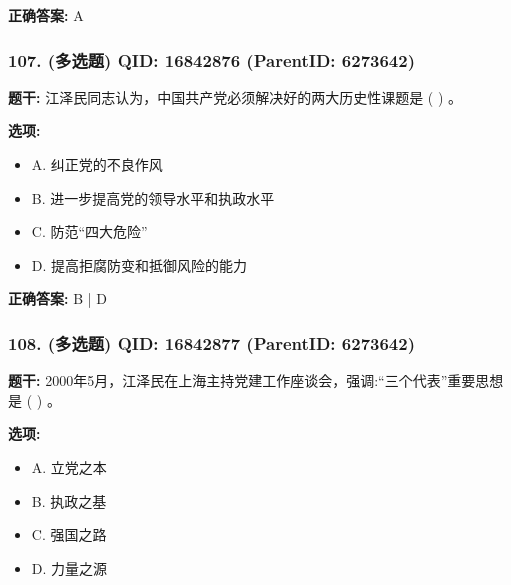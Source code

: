 \documentclass[12pt,UTF8]{ctexart}
\begin{document}
\textbf{正确答案:}
A

\vspace{0.3em}\hrulefill\vspace{0.7em}

\subsubsection*{107. (多选题) \small QID: 16842876 (ParentID: 6273642)}

\textbf{题干:}
江泽民同志认为，中国共产党必须解决好的两大历史性课题是 ( ) 。



\textbf{选项:}
\begin{itemize}[leftmargin=*]

  \item A. 纠正党的不良作风

  \item B. 进一步提高党的领导水平和执政水平

  \item C. 防范“四大危险”

  \item D. 提高拒腐防变和抵御风险的能力

\end{itemize}

\textbf{正确答案:}
B | D

\vspace{0.3em}\hrulefill\vspace{0.7em}

\subsubsection*{108. (多选题) \small QID: 16842877 (ParentID: 6273642)}

\textbf{题干:}
2000年5月，江泽民在上海主持党建工作座谈会，强调:“三个代表”重要思想是 ( ) 。



\textbf{选项:}
\begin{itemize}[leftmargin=*]

  \item A. 立党之本

  \item B. 执政之基

  \item C. 强国之路

  \item D. 力量之源

\end{itemize}
\end{document}
